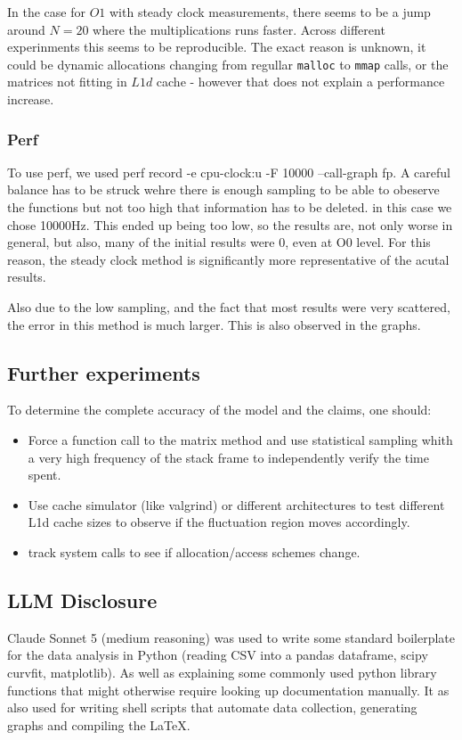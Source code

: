 \documentclass{article}
\begin{document}
In the case for $O1$ with steady clock measurements, there seems to be a jump around $N=20$ where the multiplications runs faster. Across different experinments this seems to be
reproducible. The exact reason is unknown, it could be dynamic allocations changing from regullar \texttt{malloc} to \texttt{mmap} calls, or the matrices not fitting in $L1d$ cache - however that does not
explain a performance increase.

\subsubsection{Perf}
To use perf, we used perf record -e cpu-clock:u -F 10000 --call-graph fp. A careful balance has to be struck wehre there is enough sampling to be able to obeserve the functions
but not too high that information has to be deleted. in this case we chose 10000Hz. This ended up being too low, so the results are, not only worse in general, 
but also, many of the initial results were 0, even at O0 level. For this reason, the steady clock method is significantly more representative of the acutal results.

Also due to the low sampling, and the fact that most results were very scattered, the error in this method is much larger. This is also observed in the graphs.

\subsection{Further experiments}
To determine the complete accuracy of the model and the claims, one should:
\begin{itemize}
    \item Force a function call to the matrix method and use statistical sampling whith a very high frequency of the stack frame to independently verify the time spent.
    \item Use cache simulator (like valgrind) or different architectures to test different L1d cache sizes to observe if the fluctuation region moves accordingly.
    \item track system calls to see if allocation/access schemes change.
\end{itemize}

\subsection{LLM Disclosure}
Claude Sonnet 5 (medium reasoning) was used to write some standard boilerplate for the data analysis in Python (reading CSV into a pandas dataframe, scipy curvfit, matplotlib). As well as explaining some commonly used python library functions that might otherwise require looking up documentation manually. It as also used for writing shell scripts that automate data collection, generating graphs and compiling the \LaTeX.
\end{document}
